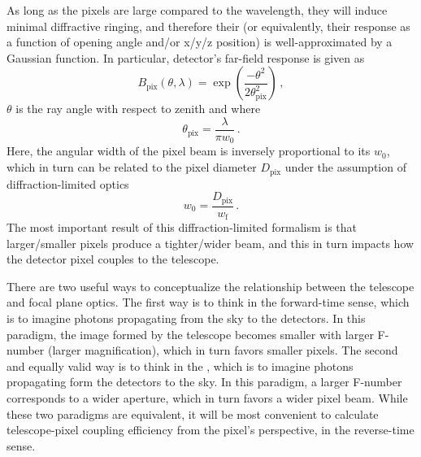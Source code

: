 As long as the pixels are large compared to the wavelength, they will induce minimal diffractive ringing, and therefore their  (or equivalently, their response as a function of opening angle and/or x/y/z position) is well-approximated by a Gaussian function. In particular, detector's far-field response is given as
\begin{equation}
    B_{\mathrm{pix}}(\theta, \lambda) = \exp \left( \frac{-\theta^{2}}{2 \theta_{\mathrm{pix}}^{2}} \right) \, ,
    \label{eq:detector_pixel_beam}
\end{equation}
$\theta$ is the ray angle with respect to zenith and where
\begin{equation}
    \theta_{\mathrm{pix}} = \frac{\lambda}{\pi w_{0}} \, .
    \label{eq:pixel_beam_divergence}
\end{equation}
Here, the angular width of the pixel beam is inversely proportional to its  $w_{0}$, which in turn can be related to the pixel diameter $D_{\mathrm{pix}}$ under the assumption of diffraction-limited optics
\begin{equation}
    w_{0} = \frac{D_{\mathrm{pix}}}{w_{\mathrm{f}}} \, .
\end{equation}
The most important result of this diffraction-limited formalism is that larger/smaller pixels produce a tighter/wider beam, and this in turn impacts how the detector pixel couples to the telescope.

There are two useful ways to conceptualize the relationship between the telescope and focal plane optics. The first way is to think in the forward-time sense, which is to imagine photons propagating from the sky to the detectors. In this paradigm, the image formed by the telescope becomes smaller with larger F-number (larger magnification), which in turn favors smaller pixels. The second and equally valid way is to think in the , which is to imagine photons propagating form the detectors to the sky. In this paradigm, a larger F-number corresponds to a wider aperture, which in turn favors a wider pixel beam. While these two paradigms are equivalent, it will be most convenient to calculate telescope-pixel coupling efficiency from the pixel's perspective, in the reverse-time sense.


